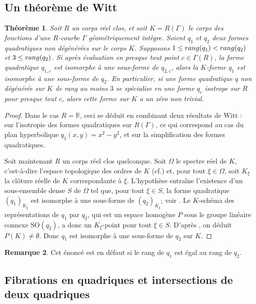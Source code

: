 \documentclass[11pt]{article}
\newcommand{\cf}{cf.\xspace}
\newcommand{\Subsection}{\subsection}
\newtheorem{thm}{Théorème}[section]
\theoremstyle{definition}
\newtheorem{rmk}[thm]{Remarque}
\newcommand{\R}{\mathbb R}
\begin{document}
\Subsection{Un théorème de Witt}

\begin{thm}\label{wittgen}
Soit $R$ un corps réel clos, et soit $K=R(\Gamma)$ le corps des fonctions d'une $R$-courbe
$\Gamma$ géométriquement intègre. Soient $q_{1}$ et $q_{2}$ deux formes quadratiques non dégénérées
sur le corps $K$. Supposons $1 \leq {\rm rang}(q_{1}) < {\rm rang}(q_{2})$ et $3 \leq {\rm rang}(q_{2})$.
Si après évaluation en presque tout point $c \in \Gamma(R)$, la forme quadratique
$q_{1,c}$ est isomorphe à une sous-forme de $q_{2,c}$, alors la $K$-forme $q_{1}$
est isomorphe à une sous-forme de $q_{2}$. En particulier, si une forme quadratique $q$
non dégénérée sur $K$ de rang au moins $3$ se spécialise en une forme $q_{c}$
isotrope sur $R$ pour presque tout $c$, alors cette forme sur $K$ a un zéro non trivial.
\end{thm}

\begin{proof}
Dans le cas $R=\R$, ceci se déduit en combinant deux résultats de Witt :
\cite[Satz 22]{witt1937theorie} sur l'isotropie des formes quadratiques sur $R(\Gamma)$, ce qui correspond au cas du plan hyperbolique $q_{1}(x,y)=x^2-y^2$, et \cite[Satz 4]{witt1937theorie} sur la simplification des formes quadratiques.

Soit maintenant $R$ un corps réel clos quelconque. Soit $\Omega$ le spectre réel de $K$, c'est-à-dire l'espace topologique des ordres de $K$ (\cf \cite[(0.4.1)]{scheiderer1994real}) et, pour tout $\xi\in \Omega$, soit $K_\xi$ la clôture réelle de $K$ correspondante à $\xi$. L'hypothèse entraîne l'existence d'un sous-ensemble dense $S$ de $\Omega$ tel que, pour tout $\xi\in S$, la forme quadratique $(q_1)_{K_\xi}$ est isomorphe à une sous-forme de $(q_2)_{K_\xi}$; voir \cite[p.\,308]{scheiderer1996hasse}. Le $K$-schéma des représentations
de $q_{1}$ par $q_{2}$, qui est un espace homogène $P$ sous le groupe linéaire
connexe $\mathrm{SO}(q_{2})$, a donc un $K_\xi$-point pour tout $\xi\in S$. D'après \cite[Cor.\,6.2]{scheiderer1996hasse}, on déduit $P(K)\neq \emptyset$. Donc $q_1$ est isomorphe à une sous-forme de $q_2$ sur $K$.
\end{proof}

\begin{rmk}
Cet énoncé est en défaut si le rang de $q_{1}$ est égal au rang de $q_{2}$.
\end{rmk}

\subsection{Fibrations en quadriques et intersections de deux quadriques}
\end{document}

